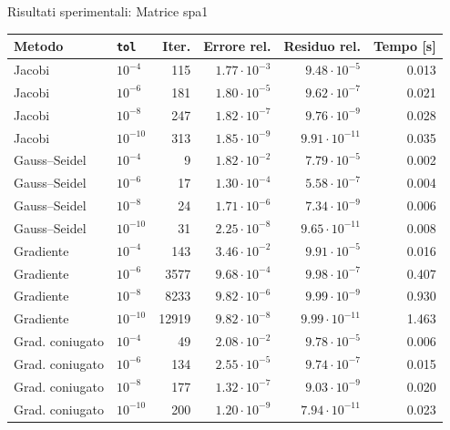\documentclass[11pt,aspectratio=169,xcolor=dvipsnames]{beamer}
\begin{document}
\begin{frame}{Risultati sperimentali: Matrice spa1}
    \begin{table}
        \centering
        \scriptsize
        \begin{tabular}{llrrrr}
        \toprule
        Metodo & \texttt{tol} & Iter. & Errore rel. & Residuo rel. & Tempo [s] \\
        \midrule
        Jacobi & $10^{-4}$ & 115 & $1.77\cdot10^{-3}$ & $9.48\cdot10^{-5}$ & 0.013 \\
        Jacobi & $10^{-6}$ & 181 & $1.80\cdot10^{-5}$ & $9.62\cdot10^{-7}$ & 0.021 \\
        Jacobi & $10^{-8}$ & 247 & $1.82\cdot10^{-7}$ & $9.76\cdot10^{-9}$ & 0.028 \\
        Jacobi & $10^{-10}$ & 313 & $1.85\cdot10^{-9}$ & $9.91\cdot10^{-11}$ & 0.035 \\
        \midrule
        Gauss--Seidel & $10^{-4}$ & 9 & $1.82\cdot10^{-2}$ & $7.79\cdot10^{-5}$ & 0.002 \\
        Gauss--Seidel & $10^{-6}$ & 17 & $1.30\cdot10^{-4}$ & $5.58\cdot10^{-7}$ & 0.004 \\
        Gauss--Seidel & $10^{-8}$ & 24 & $1.71\cdot10^{-6}$ & $7.34\cdot10^{-9}$ & 0.006 \\
        Gauss--Seidel & $10^{-10}$ & 31 & $2.25\cdot10^{-8}$ & $9.65\cdot10^{-11}$ & 0.008 \\
        \midrule
        Gradiente & $10^{-4}$ & 143 & $3.46\cdot10^{-2}$ & $9.91\cdot10^{-5}$ & 0.016 \\
        Gradiente & $10^{-6}$ & 3577 & $9.68\cdot10^{-4}$ & $9.98\cdot10^{-7}$ & 0.407 \\
        Gradiente & $10^{-8}$ & 8233 & $9.82\cdot10^{-6}$ & $9.99\cdot10^{-9}$ & 0.930 \\
        Gradiente & $10^{-10}$ & 12919 & $9.82\cdot10^{-8}$ & $9.99\cdot10^{-11}$ & 1.463 \\
        \midrule
        Grad. coniugato & $10^{-4}$ & 49 & $2.08\cdot10^{-2}$ & $9.78\cdot10^{-5}$ & 0.006 \\
        Grad. coniugato & $10^{-6}$ & 134 & $2.55\cdot10^{-5}$ & $9.74\cdot10^{-7}$ & 0.015 \\
        Grad. coniugato & $10^{-8}$ & 177 & $1.32\cdot10^{-7}$ & $9.03\cdot10^{-9}$ & 0.020 \\
        Grad. coniugato & $10^{-10}$ & 200 & $1.20\cdot10^{-9}$ & $7.94\cdot10^{-11}$ & 0.023 \\
        \bottomrule
        \end{tabular}
    \end{table}
\end{frame}
\end{document}
